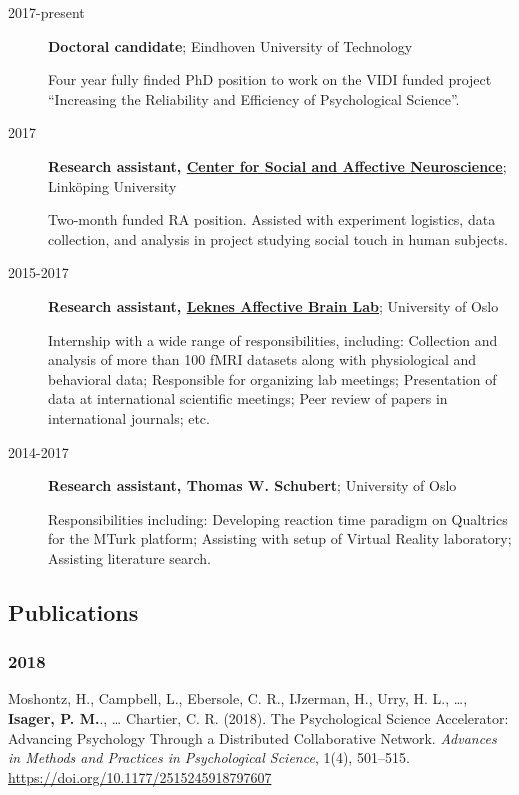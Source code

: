 \documentclass[]{article}
\begin{document}
\begin{description}
\item[2017-present]
\textbf{Doctoral candidate}; Eindhoven University of Technology

Four year fully finded PhD position to work on the VIDI funded project
``Increasing the Reliability and Efficiency of Psychological
Science''.\\
\item[2017]
\textbf{Research assistant,
\href{https://liu.se/en/organisation/liu/ike/csan}{Center for Social and
Affective Neuroscience}}; Linköping University

Two-month funded RA position. Assisted with experiment logistics, data
collection, and analysis in project studying social touch in human
subjects.\\
\item[2015-2017]
\textbf{Research assistant, \href{https://sirileknes.com/}{Leknes
Affective Brain Lab}}; University of Oslo

Internship with a wide range of responsibilities, including: Collection
and analysis of more than 100 fMRI datasets along with physiological and
behavioral data; Responsible for organizing lab meetings; Presentation
of data at international scientific meetings; Peer review of papers in
international journals; etc.\\
\item[2014-2017]
\textbf{Research assistant, Thomas W. Schubert}; University of Oslo

Responsibilities including: Developing reaction time paradigm on
Qualtrics for the MTurk platform; Assisting with setup of Virtual
Reality laboratory; Assisting literature search.
\end{description}

\subsection{Publications}\label{publications}

\subsubsection{2018}\label{section}

Moshontz, H., Campbell, L., Ebersole, C. R., IJzerman, H., Urry, H. L.,
\ldots{}, \textbf{Isager, P. M.}., \ldots{} Chartier, C. R. (2018). The
Psychological Science Accelerator: Advancing Psychology Through a
Distributed Collaborative Network. \emph{Advances in Methods and
Practices in Psychological Science}, 1(4), 501--515.
\url{https://doi.org/10.1177/2515245918797607}
\end{document}
